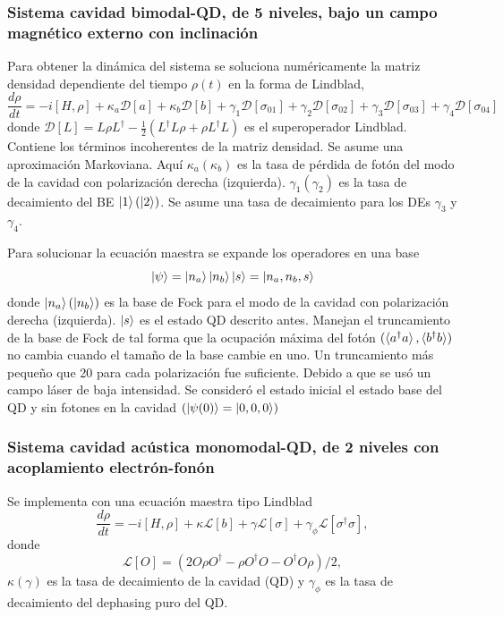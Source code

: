 \documentclass[main.tex]{subfiles}
\begin{document}
\subsubsection{Sistema cavidad bimodal-QD, de 5 niveles, bajo un campo magnético externo con inclinación}
Para obtener la dinámica del sistema se soluciona numéricamente la matriz densidad dependiente del tiempo $\rho(t)$ en la forma de Lindblad,
\begin{equation}\label{eq:masterEquationMagnetic}
	\frac{d\rho}{dt} = -i [H,\rho] + \kappa_a \mathcal{D}[a] + \kappa_b \mathcal{D}[b] + \gamma_1 \mathcal{D}[\sigma_{01}] + \gamma_2 \mathcal{D}[\sigma_{02}] + \gamma_3 \mathcal{D}[\sigma_{03}] + \gamma_4 \mathcal{D}[\sigma_{04}]
\end{equation}
donde $\mathcal{D}[L] = L\rho L^\dagger - \tfrac{1}{2}(L^\dagger L \rho + \rho L^\dagger L)$ es el superoperador Lindblad. Contiene los términos incoherentes de la matriz densidad. Se asume una aproximación Markoviana. Aquí $\kappa_a(\kappa_b)$ es la tasa de pérdida de fotón del modo de la cavidad con polarización derecha (izquierda). $\gamma_1 (\gamma_2)$ es la tasa de decaimiento del BE $\ket{1} (\ket{2})$. Se asume una tasa de decaimiento para los DEs $\gamma_3$ y $\gamma_4$.

Para solucionar la ecuación maestra se expande los operadores en una base
\begin{equation}
	\ket{\psi} = \ket{n_a}\ket{n_b}\ket{s} = \ket{n_a, n_b, s}
\end{equation}
donde $\ket{n_a} (\ket{n_b})$ es la base de Fock para el modo de la cavidad con polarización derecha (izquierda). $\ket{s}$ es el estado QD descrito antes. Manejan el truncamiento de la base de Fock de tal forma que la ocupación máxima del fotón $(\braket{a^\dagger a}, \braket{b^\dagger b})$ no cambia cuando el tamaño de la base cambie en uno. Un truncamiento más pequeño que 20 para cada polarización fue suficiente. Debido a que se usó un campo láser de baja intensidad. Se consideró el estado inicial el estado base del QD y sin fotones en la cavidad $(\ket{\psi(0)} = \ket{0,0,0})$

\subsubsection{Sistema cavidad acústica monomodal-QD, de 2 niveles con acoplamiento electrón-fonón}
Se implementa con una ecuación maestra tipo Lindblad
\begin{equation}
	\frac{d\rho}{dt} = -i[H,\rho] + \kappa \mathcal{L}[b] + \gamma \mathcal{L}[\sigma] + \gamma_\phi \mathcal{L}[\sigma^\dagger \sigma],
\end{equation}
donde
\begin{equation}
	\mathcal{L}[O] = (2O\rho O^\dagger - \rho O^\dagger O - O^\dagger O \rho)/2,
\end{equation}
$\kappa (\gamma)$ es la tasa de decaimiento de la cavidad (QD) y $\gamma_\phi$ es la tasa de decaimiento del dephasing puro del QD.
\end{document}
